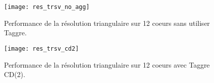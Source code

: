 \begin{figure}[t!]
  \centering
  \texttt{[image: res\_trsv\_no\_agg]}
  \caption{Performance de la résolution triangulaire sur 12 coeurs sans utiliser Taggre.}
  \label{fig:res_trsv_no_agg}
\end{figure}


\begin{figure}[t!]
  \centering
  \texttt{[image: res\_trsv\_cd2]}
  \caption{Performance de la résolution triangulaire sur 12 coeurs avec Taggre CD(2).}
  \label{fig:res_trsv_cd2}
\end{figure}


